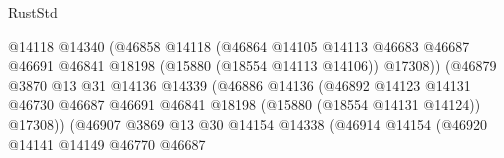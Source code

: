 \begin{lexlean}{RustStd}
\begin{coremodule}
                                              @14118
                                              @14340
                                              (@46858
                                                @14118
                                                (@46864
                                                  @14105
                                                  @14113
                                                  @46683
                                                  @46687
                                                  @46691
                                                  @46841
                                                  @18198
                                                  (@15880 (@18554 @14113 @14106))
                                                  @17308))
                                              (@46879
                                                @3870
                                                @13
                                                @31
                                                @14136
                                                @14339
                                                (@46886
                                                  @14136
                                                  (@46892
                                                    @14123
                                                    @14131
                                                    @46730
                                                    @46687
                                                    @46691
                                                    @46841
                                                    @18198
                                                    (@15880 (@18554 @14131 @14124))
                                                    @17308))
                                                (@46907
                                                  @3869
                                                  @13
                                                  @30
                                                  @14154
                                                  @14338
                                                  (@46914
                                                    @14154
                                                    (@46920
                                                      @14141
                                                      @14149
                                                      @46770
                                                      @46687

\end{coremodule}
\end{lexlean}
